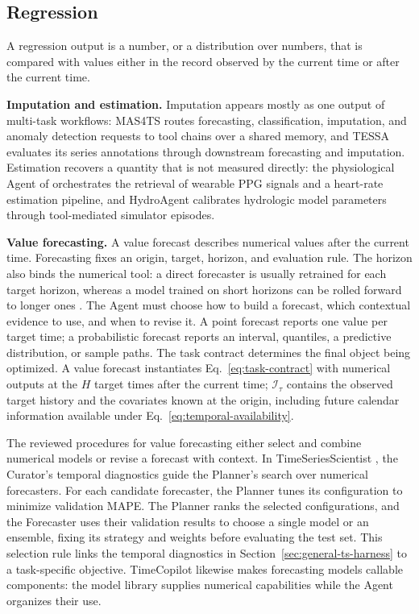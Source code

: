 \documentclass[preprints,article,submit,moreauthors]{Definitions/mdpi}
\begin{document}
\subsection{Regression}
\label{sec:task-regression}
\label{sec:task-forecasting}

A regression output is a number, or a distribution over numbers, that is compared with values either in the record observed by the current time or after the current time.

\noindent\textbf{Imputation and estimation.} Imputation appears mostly as one output of multi-task workflows: MAS4TS \citep{mas4ts2026} routes forecasting, classification, imputation, and anomaly detection requests to tool chains over a shared memory, and TESSA \citep{tessa2024} evaluates its series annotations through downstream forecasting and imputation. Estimation recovers a quantity that is not measured directly: the physiological Agent of \citet{physiologicalagent2025} orchestrates the retrieval of wearable PPG signals and a heart-rate estimation pipeline, and HydroAgent \citep{hydroagentcalibration2026} calibrates hydrologic model parameters through tool-mediated simulator episodes.

\noindent\textbf{Value forecasting.} A value forecast describes numerical values after the current time. Forecasting fixes an origin, target, horizon, and evaluation rule. The horizon also binds the numerical tool: a direct forecaster is usually retrained for each target horizon, whereas a model trained on short horizons can be rolled forward to longer ones \citep{ma2026see}. The Agent must choose how to build a forecast, which contextual evidence to use, and when to revise it. A point forecast reports one value per target time; a probabilistic forecast reports an interval, quantiles, a predictive distribution, or sample paths. The task contract determines the final object being optimized. A value forecast instantiates Eq.~\eqref{eq:task-contract} with numerical outputs at the $H$ target times after the current time; $\mathcal{I}_{\tau}$ contains the observed target history and the covariates known at the origin, including future calendar information available under Eq.~\eqref{eq:temporal-availability}.

The reviewed procedures for value forecasting either select and combine numerical models or revise a forecast with context. In TimeSeriesScientist \citep{timeseriesscientist2025}, the Curator's temporal diagnostics guide the Planner's search over numerical forecasters. For each candidate forecaster, the Planner tunes its configuration to minimize validation MAPE.
The Planner ranks the selected configurations, and the Forecaster uses their validation results to choose a single model or an ensemble, fixing its strategy and weights before evaluating the test set. This selection rule links the temporal diagnostics in Section~\ref{sec:general-ts-harness} to a task-specific objective. TimeCopilot \citep{timecopilot2025} likewise makes forecasting models callable components: the model library supplies numerical capabilities while the Agent organizes their use.
\end{document}
